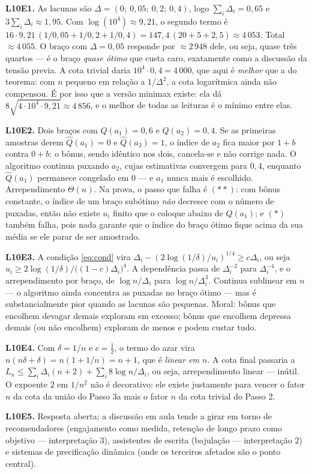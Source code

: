 \documentclass[11pt]{article}
\newcommand{\Qh}{\widehat{Q}}
\begin{document}
{\small
\textbf{L10E1.} As lacunas são $\Delta = (0;\ 0{,}05;\ 0{,}2;\ 0{,}4)$, logo
$\sum_i\Delta_i = 0{,}65$ e $3\sum_i\Delta_i \approx 1{,}95$. Com
$\log(10^{4}) \approx 9{,}21$, o segundo termo é
$16\cdot 9{,}21\,(1/0{,}05 + 1/0{,}2 + 1/0{,}4)
= 147{,}4\,(20 + 5 + 2{,}5) \approx 4\,053$. Total $\approx 4\,055$. O braço com
$\Delta = 0{,}05$ responde por $\approx 2\,948$ dele, ou seja, quase três
quartos --- é o braço \emph{quase ótimo} que custa caro, exatamente como a
discussão da tensão previa. A cota trivial daria $10^{4}\cdot 0{,}4 = 4\,000$,
que aqui é \emph{melhor} que a do teorema: com $n$ pequeno em relação a
$1/\Delta^{2}$, a cota logarítmica ainda não compensou. É por isso que a versão
minimax existe: ela dá $8\sqrt{4\cdot 10^{4}\cdot 9{,}21}\approx 4\,856$, e o
melhor de todas as leituras é o mínimo entre elas.

\textbf{L10E2.} Dois braços com $Q(a_1)=0{,}6$ e $Q(a_2)=0{,}4$. Se as
primeiras amostras derem $\Qh(a_1)=0$ e $\Qh(a_2)=1$, o índice de $a_2$ fica
maior por $1 + b$ contra $0 + b$: o bônus, sendo idêntico nos dois, cancela-se
e não corrige nada. O algoritmo continua puxando $a_2$, cujas estimativas
convergem para $0{,}4$, enquanto $\Qh(a_1)$ permanece congelado em $0$ --- e
$a_1$ nunca mais é escolhido. Arrependimento $\Theta(n)$. Na prova, o passo que
falha é $(**)$: com bônus constante, o índice de um braço subótimo \emph{não}
decresce com o número de puxadas, então não existe $u_i$ finito que o coloque
abaixo de $Q(a_1)$; e $(*)$ também falha, pois nada garante que o índice do
braço ótimo fique acima da sua média se ele parar de ser amostrado.

\textbf{L10E3.} A condição \eqref{eq:cond} vira
$\Delta_i - (2\log(1/\delta)/u_i)^{1/4} \ge c\Delta_i$, ou seja
$u_i \ge 2\log(1/\delta)/\bigl((1-c)\Delta_i\bigr)^{4}$. A dependência passa de
$\Delta_i^{-2}$ para $\Delta_i^{-4}$, e o arrependimento por braço, de
$\log n/\Delta_i$ para $\log n/\Delta_i^{3}$. Continua sublinear em $n$ --- o
algoritmo ainda concentra as puxadas no braço ótimo --- mas é
substancialmente pior quando as lacunas são pequenas. Moral: bônus que encolhem
devagar demais exploram em excesso; bônus que encolhem depressa demais (ou não
encolhem) exploram de menos e podem custar tudo.

\textbf{L10E4.} Com $\delta = 1/n$ e $c=\tfrac12$, o termo do azar vira
$n(n\delta + \delta) = n(1 + 1/n) = n + 1$, que é \emph{linear em $n$}. A cota
final passaria a $L_n \le \sum_i \Delta_i(n+2) + \sum_i 8\log n/\Delta_i$, ou
seja, arrependimento linear --- inútil. O expoente $2$ em $1/n^{2}$ não é
decorativo: ele existe justamente para vencer o fator $n$ da cota da união do
Passo 3a mais o fator $n$ da cota trivial do Passo 2.

\textbf{L10E5.} Resposta aberta; a discussão em aula tende a girar em torno de
recomendadores (engajamento como medida, retenção de longo prazo como
objetivo --- interpretação 3), assistentes de escrita (bajulação ---
interpretação 2) e sistemas de precificação dinâmica (onde os terceiros
afetados são o ponto central).}
\end{document}
